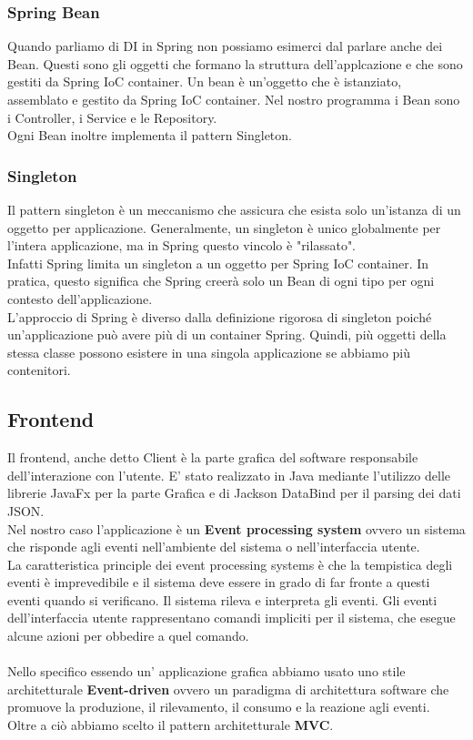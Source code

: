 \documentclass[a4paper,12pt,openany,oneside]{book}
\begin{document}

\subsubsection{Spring Bean}
Quando parliamo di DI in Spring non possiamo esimerci dal parlare anche dei Bean. Questi sono gli oggetti che formano la struttura dell'applcazione e che sono gestiti da Spring IoC container.
Un bean è un'oggetto che è istanziato, assemblato e gestito da Spring IoC container. Nel nostro programma i Bean sono i Controller, i Service e le Repository.\\
Ogni Bean inoltre implementa il pattern Singleton.\\

\subsubsection{Singleton}
Il pattern singleton è un meccanismo che assicura che esista solo un'istanza di un oggetto per applicazione.
Generalmente, un singleton è unico globalmente per l'intera applicazione, ma in Spring questo vincolo è "rilassato".\\
Infatti Spring limita un singleton a un oggetto per Spring IoC container.
In pratica, questo significa che Spring creerà solo un Bean di ogni tipo per ogni contesto dell'applicazione.\\
L'approccio di Spring è diverso dalla definizione rigorosa di singleton poiché un'applicazione può avere più di un container Spring. 
Quindi, più oggetti della stessa classe possono esistere in una singola applicazione se abbiamo più contenitori.

\subsection{Frontend}
Il frontend, anche detto Client è la parte grafica del software responsabile dell'interazione con l'utente.
E' stato realizzato in Java mediante l'utilizzo delle librerie JavaFx per la parte Grafica e di Jackson DataBind per il parsing dei dati JSON.\\
Nel nostro caso l'applicazione è un \textbf{Event processing system} ovvero un sistema che risponde agli eventi nell'ambiente del sistema o nell'interfaccia utente.\\
La caratteristica principle dei event processing systems è che la tempistica degli eventi è imprevedibile e il sistema deve essere in grado di far fronte a questi eventi quando si verificano.
Il sistema rileva e interpreta gli eventi. Gli eventi dell'interfaccia utente rappresentano comandi impliciti per il sistema, che esegue alcune azioni per obbedire a quel comando.\\\\
Nello specifico essendo un' applicazione grafica abbiamo usato uno stile architetturale \textbf{Event-driven} ovvero un paradigma di architettura software che promuove la produzione, il rilevamento, il consumo e la reazione agli eventi.\\
Oltre a ciò abbiamo scelto il pattern architetturale \textbf{MVC}.
\end{document}
